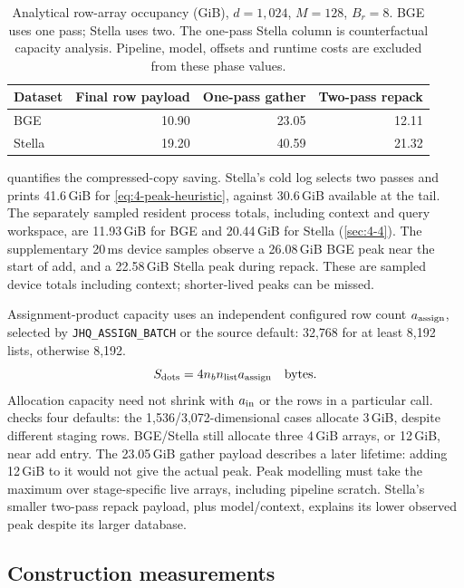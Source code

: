 \begin{table}[tbp]
\centering
\caption[Analytical row-array occupancy by construction phase]{Analytical row-array occupancy (GiB), $d=1{,}024$, $M=128$,
$B_r=8$. BGE uses one pass; Stella uses two. The one-pass Stella column
is counterfactual capacity analysis. Pipeline, model, offsets and runtime
costs are excluded from these phase values.}
\label{tab:4-phase-storage}
\small
\begin{tabular}{@{}lrrr@{}}
\toprule
Dataset & Final row payload & One-pass gather & Two-pass repack \\
\midrule
BGE & 10.90 & 23.05 & 12.11 \\
Stella & 19.20 & 40.59 & 21.32 \\
\bottomrule
\end{tabular}
\end{table}

 quantifies the compressed-copy saving. Stella's
cold log selects two passes and prints 41.6\,GiB for
\cref{eq:4-peak-heuristic}, against 30.6\,GiB available at the tail.
The separately sampled resident process totals, including context and
query workspace, are 11.93\,GiB for BGE and 20.44\,GiB for Stella
(\cref{sec:4-4}). The supplementary 20\,ms device samples observe a 26.08\,GiB BGE peak
near the start of add, and a 22.58\,GiB Stella peak during repack.
These are sampled device totals including context; shorter-lived peaks
can be missed.

Assignment-product capacity uses an independent configured row count
$a_{\rm assign}$, selected by \texttt{JHQ\_ASSIGN\_BATCH} or the source
default: 32,768 for at least 8,192 lists, otherwise 8,192.
\begin{equation}
 S_{\rm dots}=4n_b n_{\rm list}a_{\rm assign}\quad\text{bytes}.
 \label{eq:4-assignment-scratch}
\end{equation}
Allocation capacity need not shrink with $a_{\rm in}$ or the rows in a
particular call.  checks four defaults: the 1,536/3,072-dimensional
cases allocate 3\,GiB, despite different staging rows. BGE/Stella still
allocate three 4\,GiB arrays, or 12\,GiB, near add entry. The 23.05\,GiB gather
payload describes a later lifetime: adding 12\,GiB to it would not give
the actual peak. Peak modelling must take the maximum over stage-specific
live arrays, including pipeline scratch. Stella's smaller two-pass
repack payload, plus model/context, explains its lower observed peak
despite its larger database.

\subsection{Construction measurements}

